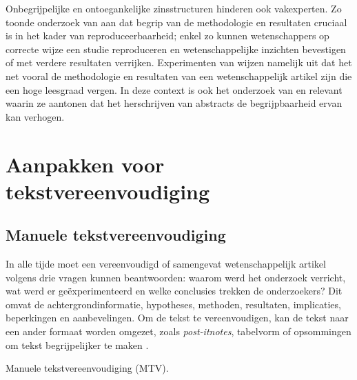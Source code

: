 \medspace

Onbegrijpelijke en ontoegankelijke zinsstructuren hinderen ook vakexperten. Zo toonde onderzoek van \textcite{McNutt2014} aan dat begrip van de methodologie en resultaten cruciaal is in het kader van reproduceerbaarheid; enkel zo kunnen wetenschappers op correcte wijze een studie reproduceren en wetenschappelijke inzichten bevestigen of met verdere resultaten verrijken. Experimenten van \textcite{Hubbard2017} wijzen namelijk uit dat het net vooral de methodologie en resultaten van een wetenschappelijk artikel zijn die een hoge leesgraad vergen. In deze context is ook het onderzoek van \textcite{Hartley1999} en \textcite{Snow2010} relevant waarin ze aantonen dat het herschrijven van abstracts de begrijpbaarheid ervan kan verhogen.


\section{Aanpakken voor tekstvereenvoudiging}

\subsection{Manuele tekstvereenvoudiging}

In alle tijde moet een vereenvoudigd of samengevat wetenschappelijk artikel volgens \textcite{Hollenkamp2020, McCombes2022} drie vragen kunnen beantwoorden: waarom werd het onderzoek verricht, wat werd er geëxperimenteerd en welke conclusies trekken de onderzoekers? Dit omvat de achtergrondinformatie, hypotheses, methoden, resultaten, implicaties, beperkingen en aanbevelingen. Om de tekst te vereenvoudigen, kan de tekst naar een ander formaat worden omgezet, zoals \textit{post-itnotes}, tabelvorm of opsommingen om tekst begrijpelijker te maken \autocite{Rijkhoff2022}. 

Manuele tekstvereenvoudiging (MTV).

